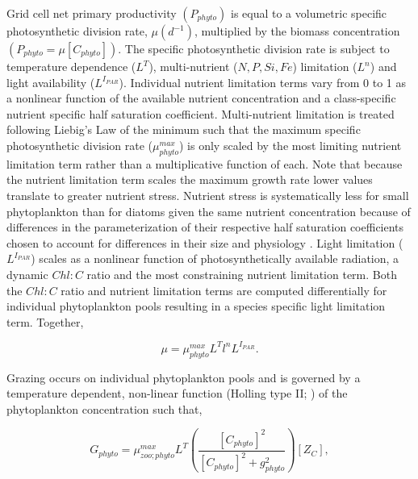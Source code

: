 Grid cell net primary productivity $(P_{phyto})$ is equal to a volumetric specific photosynthetic division rate, $\mu (d^{-1})$, multiplied by the biomass concentration $(P_{phyto} = \mu[C_{phyto}])$. The specific photosynthetic division rate is subject to temperature dependence ($L^T$), multi-nutrient ($N, P, Si, Fe$) limitation ($L^n$) and light availability ($L^{I_{PAR}}$). Individual nutrient limitation terms vary from 0 to 1 as a nonlinear function of the available nutrient concentration and a class-specific nutrient specific half saturation coefficient. Multi-nutrient limitation is treated following Liebig's Law of the minimum \parencite{vanderPloegOriginTheoryMineral1999} such that the maximum specific photosynthetic division rate ($\mu^{max}_{phyto}$) is only scaled by the most limiting nutrient limitation term rather than a multiplicative function of each. Note that because the nutrient limitation term scales the maximum growth rate lower values translate to greater nutrient stress.  Nutrient stress is systematically less for small phytoplankton than for diatoms given the same nutrient concentration because of differences in the parameterization of their respective half saturation coefficients chosen to account for differences in their size and physiology \parencite{SundaIronuptakegrowth1995}. Light limitation ($L^{I_{PAR}}$) scales as a nonlinear function of photosynthetically available radiation, a dynamic $Chl:C$ ratio and the most constraining nutrient limitation term. Both the $Chl:C$ ratio and nutrient limitation terms are computed differentially for individual phytoplankton pools resulting in a species specific light limitation term. Together,

\begin{equation}
    \mu = \mu^{max}_{phyto} L^T l^n L^{I_{PAR}}.
\end{equation}

Grazing occurs on individual phytoplankton pools and is governed by a temperature dependent, non-linear function (Holling type II; \parencite{HollingCharacteristicsSimpleTypes1959}) of the phytoplankton concentration such that,

\begin{equation}
    G_{phyto} = \mu^{max}_{zoo;phyto} L^T (\frac{[C_{phyto}]^2}{[C_{phyto}]^2 +g^2_{phyto}}) [Z_C],
\end{equation}

